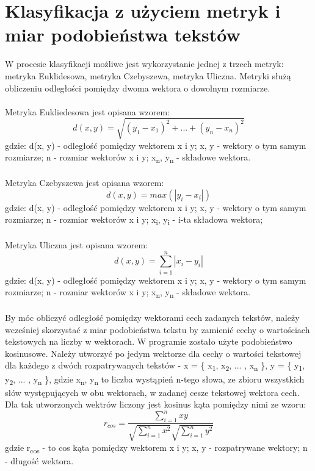 \documentclass{classrep}
\begin{document}
\section{Klasyfikacja z użyciem metryk i miar podobieństwa tekstów}

W procesie klasyfikacji możliwe jest wykorzystanie jednej z trzech metryk: metryka Euklidesowa, metryka Czebyszewa, metryka Uliczna. Metryki służą obliczeniu odległości pomiędzy dwoma wektora o dowolnym rozmiarze.\\\\ Metryka Eukliedesowa\cite{dane} jest opisana wzorem: 
\begin{equation} d(x, y) = \sqrt{(y_1 - x_1)^2 + ... + (y_n - x_n)^2}  \end{equation}
gdzie: d(x, y) - odległość pomiędzy wektorem x i y; x, y - wektory o tym samym rozmiarze; n - rozmiar wektorów x i y;  x\textsubscript{n}, y\textsubscript{n} - składowe wektora. 
\\\\
Metryka Czebyszewa\cite{dane} jest opisana wzorem: 
\begin{equation} d(x, y) = max(|y_i - x_i|) \end{equation}
gdzie: d(x, y) - odległość pomiędzy wektorem x i y; x, y - wektory o tym samym rozmiarze; n - rozmiar wektorów x i y;  x\textsubscript{i}, y\textsubscript{i} - i-ta składowa wektora;
\\\\
Metryka Uliczna\cite{dane} jest opisana wzorem: 
\begin{equation} d(x, y) = \sum_{i = 1}^{n} |x_i - y_i| \end{equation}
gdzie: d(x, y) - odległość pomiędzy wektorem x i y; x, y - wektory o tym samym rozmiarze; n - rozmiar wektorów x i y;  x\textsubscript{n}, y\textsubscript{n} - składowe wektora. 
\\\\
By móc obliczyć odległość pomiędzy wektorami cech zadanych tekstów, należy wcześniej skorzystać z miar podobieństwa tekstu by zamienić cechy o wartościach tekstowych na liczby w wektorach. W programie zostało użyte podobieństwo kosinusowe\cite{wyklad}. Należy utworzyć po jedym wektorze dla cechy o wartości tekstowej dla każdego z dwóch rozpatrywanych tekstów - x = \{ x\textsubscript{1}, x\textsubscript{2}, ... , x\textsubscript{n} \},  y = \{ y\textsubscript{1}, y\textsubscript{2}, ... , y\textsubscript{n} \}, gdzie x\textsubscript{n}, y\textsubscript{n}  to liczba wystąpień n-tego słowa, ze zbioru wszystkich słów występujących w obu wektorach, w zadanej cesze tekstowej wektora cech. Dla tak utworzonych wektrów liczony jest kosinus kąta pomiędzy nimi ze wzoru:
\begin{equation} r_{cos} = \frac{\sum_{i = 1}^{n} x y}{\sqrt{\sum_{i = 1}^{n} x^2}\sqrt{\sum_{i = 1}^{n} y^2}} \end{equation}
gdzie r\textsubscript{cos} - to cos kąta pomiędzy wektorem x i y; x, y - rozpatrywane wektory; n - długość wektora.
\ \\ \\ 
\end{document}
